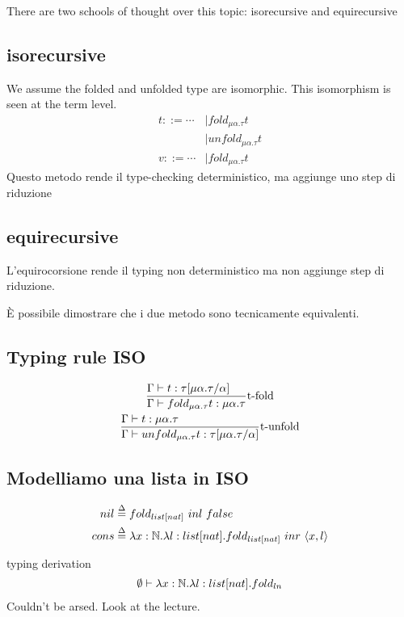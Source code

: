 \documentclass{article}
\begin{document}
There are two schools of thought over this topic: isorecursive and equirecursive

\subsection{isorecursive}
We assume the folded and unfolded type are isomorphic. This isomorphism is seen at the term level.
\begin{align*}
    t ::=\cdots &|fold_{\mu\alpha.\tau}t \\
                &|unfold_{\mu\alpha.\tau} t \\
    v ::= \cdots &|fold_{\mu\alpha.\tau} t
\end{align*}
Questo metodo rende il type-checking deterministico, ma aggiunge uno step di riduzione

\subsection{equirecursive}
L'equirocorsione rende il typing non deterministico ma non aggiunge step di riduzione. 

È possibile dimostrare che i due metodo sono tecnicamente equivalenti.

\subsection{Typing rule ISO}
\begin{gather*}
    \st[t-fold]{
        \Gamma\vdash fold_{\mu\alpha.\tau} t : \mu\alpha.\tau
    }{
        \Gamma\vdash t:\tau[\mu\alpha.\tau/\alpha]
    } \\
    \st[t-unfold]{
        \Gamma\vdash unfold_{\mu\alpha.\tau}t:\tau[\mu\alpha.\tau/\alpha]
    }{
        \Gamma\vdash t:\mu\alpha.\tau
    } \\
\end{gather*}

\subsection{Modelliamo una lista in ISO}
\begin{align*}
    nil &\overset\Delta=fold_{list[nat]}\ inl\  false \\
    cons &\overset\Delta= \lambda x:\mathbb N.\lambda l:list[nat].fold_{list[nat]}\ inr\ \langle x, l\rangle
\end{align*}

\begin{callout}{typing derivation}
    \begin{align*}
        \emptyset\vdash\lambda x:\mathbb N.\lambda l:list[nat].fold_{ln}
    \end{align*}
    Couldn't be arsed. Look at the lecture.
\end{callout}
\end{document}
